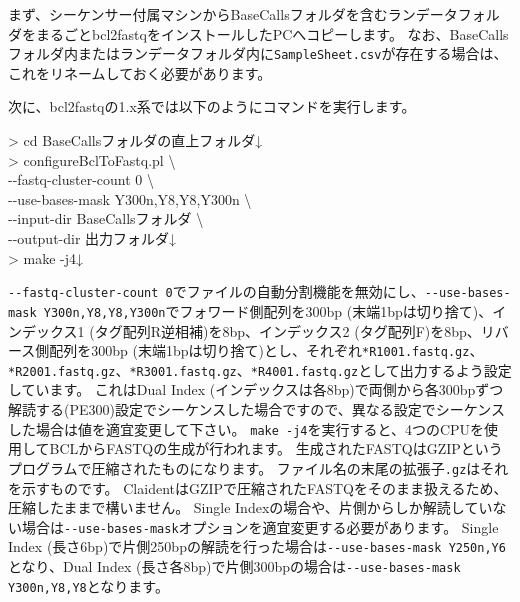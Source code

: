 \documentclass[titlepage,10pt,a4paper]{jsbook}
\newenvironment{cmd}{\begin{oframed}\raggedright\ttfamily\footnotesize\setlength{\baselineskip}{1.4em}}{\end{oframed}\vspace{-1em}}
\begin{document}
まず、シーケンサー付属マシンからBaseCallsフォルダを含むランデータフォルダをまるごとbcl2fastqをインストールしたPCへコピーします。
なお、BaseCallsフォルダ内またはランデータフォルダ内に\texttt{SampleSheet.csv}が存在する場合は、これをリネームしておく必要があります。

次に、bcl2fastqの1.x系では以下のようにコマンドを実行します。
\begin{cmd}
{\textgreater} cd BaseCallsフォルダの直上フォルダ↓\\
{\textgreater} configureBclToFastq.pl {\textbackslash}\\
{-}{-}fastq-cluster-count 0 {\textbackslash}\\
{-}{-}use-bases-mask Y300n,Y8,Y8,Y300n {\textbackslash}\\
{-}{-}input-dir BaseCallsフォルダ {\textbackslash}\\
{-}{-}output-dir 出力フォルダ↓\\
{\textgreater} make -j4↓
\end{cmd}
\texttt{{-}{-}fastq-cluster-count 0}でファイルの自動分割機能を無効にし、\texttt{{-}{-}use-bases-mask Y300n,Y8,Y8,Y300n}でフォワード側配列を300bp (末端1bpは切り捨て)、インデックス1 (タグ配列R逆相補)を8bp、インデックス2 (タグ配列F)を8bp、リバース側配列を300bp (末端1bpは切り捨て)とし、それぞれ\texttt{*{\textunderscore}R1{\textunderscore}001.fastq.gz}、\texttt{*{\textunderscore}R2{\textunderscore}001.fastq.gz}、\texttt{*{\textunderscore}R3{\textunderscore}001.fastq.gz}、\texttt{*{\textunderscore}R4{\textunderscore}001.fastq.gz}として出力するよう設定しています。
これはDual Index (インデックスは各8bp)で両側から各300bpずつ解読する(PE300)設定でシーケンスした場合ですので、異なる設定でシーケンスした場合は値を適宜変更して下さい。
\texttt{make -j4}を実行すると、4つのCPUを使用してBCLからFASTQの生成が行われます。
生成されたFASTQはGZIPというプログラムで圧縮されたものになります。
ファイル名の末尾の拡張子\texttt{.gz}はそれを示すものです。
ClaidentはGZIPで圧縮されたFASTQをそのまま扱えるため、圧縮したままで構いません。
Single Indexの場合や、片側からしか解読していない場合は\texttt{{-}{-}use-bases-mask}オプションを適宜変更する必要があります。
Single Index (長さ6bp)で片側250bpの解読を行った場合は\texttt{{-}{-}use-bases-mask Y250n,Y6}となり、Dual Index (長さ各8bp)で片側300bpの場合は\texttt{{-}{-}use-bases-mask Y300n,Y8,Y8}となります。
\end{document}
